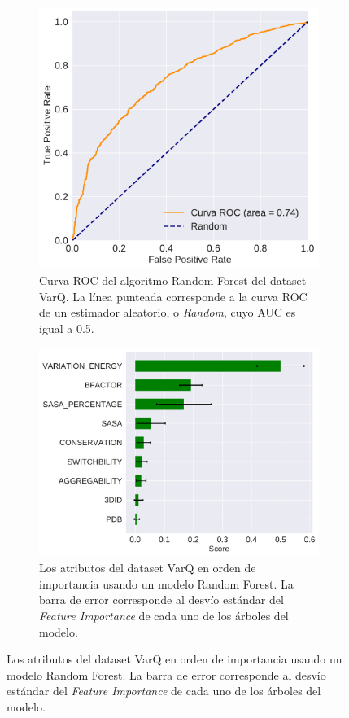 \begin{figure}[H]
\centering
\begin{subfigure}{0.8\textwidth}
    \includegraphics[width=\textwidth]{documents/latex/figures/3/varq/auc_varq.pdf}
    \caption{Curva ROC del algoritmo Random Forest del dataset VarQ. La línea punteada corresponde a la curva ROC de un estimador aleatorio, o \textit{Random}, cuyo AUC es igual a 0.5.}
    \label{fig:auc_varq}
\end{subfigure}
\begin{subfigure}{0.8\textwidth}
    \includegraphics[width=\textwidth]{documents/latex/figures/3/varq/importances_varq.pdf}
    \caption{Los atributos del dataset VarQ en orden de importancia usando un modelo Random Forest. La barra de error corresponde al desvío estándar del \textit{Feature Importance} de cada uno de los árboles del modelo.}
    \label{fig:importance_varq}
\end{subfigure}
\end{figure}

